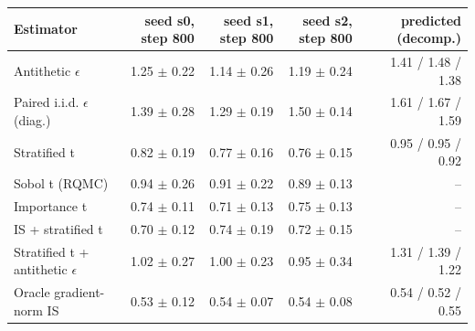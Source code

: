 \begin{tabular}{lrrrr}
\toprule
Estimator & seed s0, step 800 & seed s1, step 800 & seed s2, step 800 & predicted (decomp.) \\
\midrule
Antithetic $\epsilon$ & 1.25 $\pm$ 0.22 & 1.14 $\pm$ 0.26 & 1.19 $\pm$ 0.24 & 1.41 / 1.48 / 1.38 \\
Paired i.i.d. $\epsilon$ (diag.) & 1.39 $\pm$ 0.28 & 1.29 $\pm$ 0.19 & 1.50 $\pm$ 0.14 & 1.61 / 1.67 / 1.59 \\
Stratified t & 0.82 $\pm$ 0.19 & 0.77 $\pm$ 0.16 & 0.76 $\pm$ 0.15 & 0.95 / 0.95 / 0.92 \\
Sobol t (RQMC) & 0.94 $\pm$ 0.26 & 0.91 $\pm$ 0.22 & 0.89 $\pm$ 0.13 & -- \\
Importance t & 0.74 $\pm$ 0.11 & 0.71 $\pm$ 0.13 & 0.75 $\pm$ 0.13 & -- \\
IS + stratified t & 0.70 $\pm$ 0.12 & 0.74 $\pm$ 0.19 & 0.72 $\pm$ 0.15 & -- \\
Stratified t + antithetic $\epsilon$ & 1.02 $\pm$ 0.27 & 1.00 $\pm$ 0.23 & 0.95 $\pm$ 0.34 & 1.31 / 1.39 / 1.22 \\
Oracle gradient-norm IS & 0.53 $\pm$ 0.12 & 0.54 $\pm$ 0.07 & 0.54 $\pm$ 0.08 & 0.54 / 0.52 / 0.55 \\
\bottomrule
\end{tabular}
